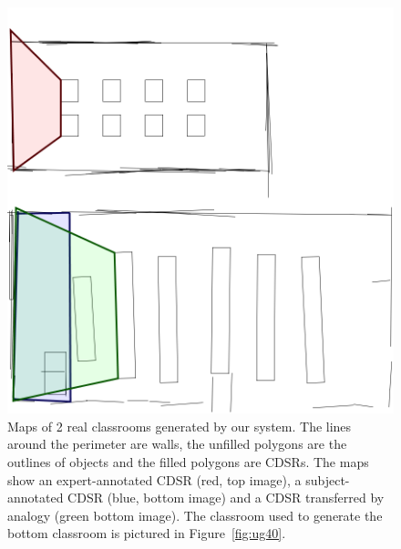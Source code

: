 \documentclass[letterpaper]{article}
\begin{document}
\begin{figure}
 \includegraphics[width=\columnwidth]{images/worked-example.png}
  \caption{Maps of 2 real classrooms generated by our system. The lines around the perimeter are walls, the unfilled polygons are the outlines of objects and the filled polygons are CDSRs. The maps show an expert-annotated CDSR (red, top image), a subject-annotated CDSR (blue, bottom image) and a CDSR transferred by analogy (green bottom image). The classroom used to generate the bottom classroom is pictured in Figure~\ref{fig:ug40}.}
  \label{fig:rooms}
\end{figure}
\end{document}
